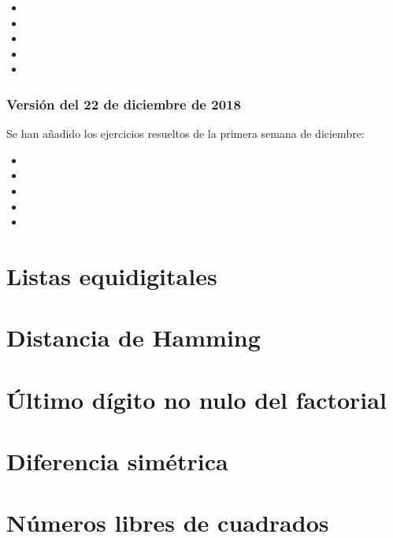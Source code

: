 \documentclass[a4paper,12pt,twoside]{book}
\begin{document}
\begin{itemize}
\item {}
\item {}
\item {}
\item {}
\item {}
\end{itemize}
     
\subsection*{Versión del 22 de diciembre de 2018}

Se han añadido los ejercicios resueltos de la primera semana de
diciembre:

\begin{itemize}
\item {}
\item {}
\item {}
\item {}
\item {}
\end{itemize}
     
\chapter{Listas equidigitales}

\chapter{Distancia de Hamming}

\chapter{Último dígito no nulo del factorial}

\chapter{Diferencia simétrica}

\chapter{Números libres de cuadrados}
\end{document}
